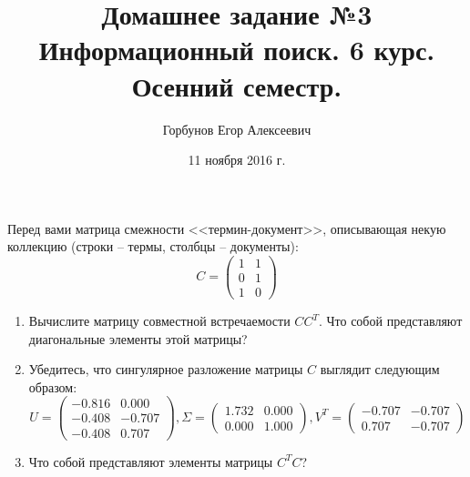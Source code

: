 


\title{Домашнее задание №3 \\ Информационный поиск. 6 курс. Осенний семестр.}
\author{Горбунов Егор Алексеевич}
\date{11 ноября 2016 г.}

\maketitle

\begin{task}[1]
Перед вами матрица смежности <<термин-документ>>, описывающая некую коллекцию (строки -- термы, столбцы -- документы):
\begin{equation*}
	C = 
	\begin{pmatrix}
	1 & 1 \\
	0 & 1 \\
	1 & 0
	\end{pmatrix}
\end{equation*}
\begin{enumerate}
	\item Вычислите матрицу совместной встречаемости $CC^T$. Что собой представляют диагональные элементы этой матрицы?
	\item Убедитесь, что сингулярное разложение матрицы $C$ выглядит следующим образом:
	\begin{equation*}
		U = 
		\begin{pmatrix}
		 -0.816 & 0.000 \\
		 -0.408 & -0.707 \\
		 -0.408 & 0.707
		\end{pmatrix}
		,
		\Sigma =
		\begin{pmatrix}
		1.732 & 0.000 \\
		0.000 & 1.000
		\end{pmatrix}
		,
		V^T = 
		\begin{pmatrix}
		-0.707 & -0.707 \\
		0.707 & -0.707
		\end{pmatrix}
	\end{equation*}
	\item Что собой представляют элементы матрицы $C^TC$? \label{t1:item3} 
\end{enumerate}
\end{task}
